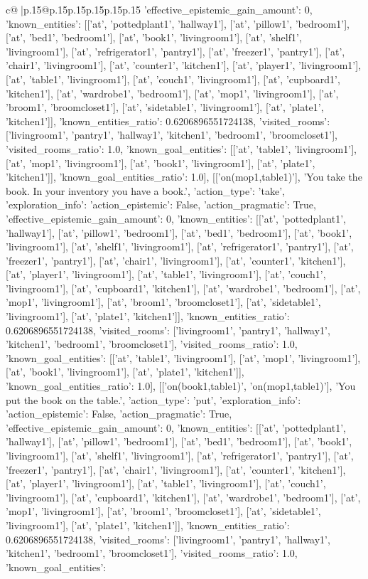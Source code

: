 \documentclass{article}
\begin{document}
{\begin{supertabular}{c@{$\;$}|p{.15\linewidth}@{}p{.15\linewidth}p{.15\linewidth}p{.15\linewidth}p{.15\linewidth}p{.15\linewidth}}
{{{'effective_epistemic_gain_amount': 0, 'known_entities': [['at', 'pottedplant1', 'hallway1'], ['at', 'pillow1', 'bedroom1'], ['at', 'bed1', 'bedroom1'], ['at', 'book1', 'livingroom1'], ['at', 'shelf1', 'livingroom1'], ['at', 'refrigerator1', 'pantry1'], ['at', 'freezer1', 'pantry1'], ['at', 'chair1', 'livingroom1'], ['at', 'counter1', 'kitchen1'], ['at', 'player1', 'livingroom1'], ['at', 'table1', 'livingroom1'], ['at', 'couch1', 'livingroom1'], ['at', 'cupboard1', 'kitchen1'], ['at', 'wardrobe1', 'bedroom1'], ['at', 'mop1', 'livingroom1'], ['at', 'broom1', 'broomcloset1'], ['at', 'sidetable1', 'livingroom1'], ['at', 'plate1', 'kitchen1']], 'known_entities_ratio': 0.6206896551724138, 'visited_rooms': ['livingroom1', 'pantry1', 'hallway1', 'kitchen1', 'bedroom1', 'broomcloset1'], 'visited_rooms_ratio': 1.0, 'known_goal_entities': [['at', 'table1', 'livingroom1'], ['at', 'mop1', 'livingroom1'], ['at', 'book1', 'livingroom1'], ['at', 'plate1', 'kitchen1']], 'known_goal_entities_ratio': 1.0}}], [['on(mop1,table1)'], 'You take the book. In your inventory you have a book.', {'action_type': 'take', 'exploration_info': {'action_epistemic': False, 'action_pragmatic': True, 'effective_epistemic_gain_amount': 0, 'known_entities': [['at', 'pottedplant1', 'hallway1'], ['at', 'pillow1', 'bedroom1'], ['at', 'bed1', 'bedroom1'], ['at', 'book1', 'livingroom1'], ['at', 'shelf1', 'livingroom1'], ['at', 'refrigerator1', 'pantry1'], ['at', 'freezer1', 'pantry1'], ['at', 'chair1', 'livingroom1'], ['at', 'counter1', 'kitchen1'], ['at', 'player1', 'livingroom1'], ['at', 'table1', 'livingroom1'], ['at', 'couch1', 'livingroom1'], ['at', 'cupboard1', 'kitchen1'], ['at', 'wardrobe1', 'bedroom1'], ['at', 'mop1', 'livingroom1'], ['at', 'broom1', 'broomcloset1'], ['at', 'sidetable1', 'livingroom1'], ['at', 'plate1', 'kitchen1']], 'known_entities_ratio': 0.6206896551724138, 'visited_rooms': ['livingroom1', 'pantry1', 'hallway1', 'kitchen1', 'bedroom1', 'broomcloset1'], 'visited_rooms_ratio': 1.0, 'known_goal_entities': [['at', 'table1', 'livingroom1'], ['at', 'mop1', 'livingroom1'], ['at', 'book1', 'livingroom1'], ['at', 'plate1', 'kitchen1']], 'known_goal_entities_ratio': 1.0}}], [['on(book1,table1)', 'on(mop1,table1)'], 'You put the book on the table.', {'action_type': 'put', 'exploration_info': {'action_epistemic': False, 'action_pragmatic': True, 'effective_epistemic_gain_amount': 0, 'known_entities': [['at', 'pottedplant1', 'hallway1'], ['at', 'pillow1', 'bedroom1'], ['at', 'bed1', 'bedroom1'], ['at', 'book1', 'livingroom1'], ['at', 'shelf1', 'livingroom1'], ['at', 'refrigerator1', 'pantry1'], ['at', 'freezer1', 'pantry1'], ['at', 'chair1', 'livingroom1'], ['at', 'counter1', 'kitchen1'], ['at', 'player1', 'livingroom1'], ['at', 'table1', 'livingroom1'], ['at', 'couch1', 'livingroom1'], ['at', 'cupboard1', 'kitchen1'], ['at', 'wardrobe1', 'bedroom1'], ['at', 'mop1', 'livingroom1'], ['at', 'broom1', 'broomcloset1'], ['at', 'sidetable1', 'livingroom1'], ['at', 'plate1', 'kitchen1']], 'known_entities_ratio': 0.6206896551724138, 'visited_rooms': ['livingroom1', 'pantry1', 'hallway1', 'kitchen1', 'bedroom1', 'broomcloset1'], 'visited_rooms_ratio': 1.0, 'known_goal_entities': }}}
\end{supertabular}}
\end{document}
